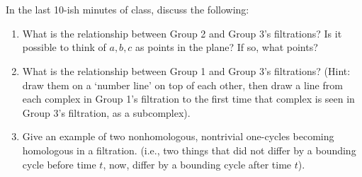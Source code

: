 \documentclass{article}
\begin{document}
\pagebreak
\section*{}

In the last 10-ish minutes of class, discuss the following:

\begin{enumerate}
    \item What is the relationship between Group 2 and Group 3's filtrations?
        Is it possible to think of $a,b,c$ as points in the plane? If so, what
        points?
    \item What is the relationship between Group 1 and Group 3's filtrations?
        (Hint: draw them on a `number line' on top of each other, then draw a
        line from each complex in Group 1's filtration to the first time that complex
        is seen in Group 3's filtration, as a subcomplex).
    \item Give an example of two nonhomologous, nontrivial one-cycles becoming
        homologous in a filtration. (i.e., two things that did not differ by a
        bounding cycle before time $t$, now, differ by a bounding cycle after
        time $t$).
\end{enumerate}
\end{document}
